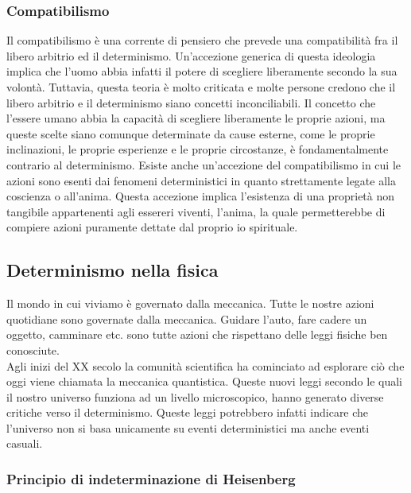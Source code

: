 \documentclass[a4paper, 12pt]{article}
\begin{document}
\subsubsection{Compatibilismo}

Il compatibilismo\cite{com} è una corrente di pensiero che prevede una compatibilità
fra il libero arbitrio ed il determinismo. Un'accezione generica di questa ideologia
implica che l'uomo abbia infatti il potere di scegliere liberamente secondo la sua volontà.
Tuttavia, questa teoria è molto criticata e molte persone credono che
il libero arbitrio e il determinismo siano concetti inconciliabili.
Il concetto che l'essere umano abbia la capacità di scegliere liberamente le proprie azioni,
ma queste scelte siano comunque determinate da cause esterne,
come le proprie inclinazioni, le proprie esperienze e le proprie circostanze,
è fondamentalmente contrario al determinismo.
Esiste anche un'accezione del compatibilismo in cui le azioni sono
esenti dai fenomeni deterministici in quanto strettamente legate alla coscienza o all'anima.
Questa accezione implica l'esistenza di una proprietà non tangibile
appartenenti agli essereri viventi, l'anima, la quale permetterebbe di compiere
azioni puramente dettate dal proprio io spirituale.

\subsection{Determinismo nella fisica}

Il mondo in cui viviamo è governato dalla meccanica.
Tutte le nostre azioni quotidiane sono governate dalla meccanica.
Guidare l'auto, fare cadere un oggetto, camminare etc. sono tutte azioni
che rispettano delle leggi fisiche ben conosciute. \\
Agli inizi del XX secolo la comunità scientifica ha cominciato ad esplorare ciò che
oggi viene chiamata la meccanica quantistica. Queste nuovi leggi secondo le quali il nostro universo funziona
ad un livello microscopico, hanno generato diverse critiche verso il determinismo.
Queste leggi potrebbero infatti indicare che l'universo non si basa unicamente su eventi deterministici ma anche eventi casuali.

\subsubsection{Principio di indeterminazione di Heisenberg}
\end{document}
